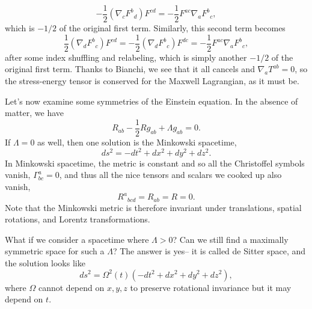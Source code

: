 {\begin{equation*}
        -\frac{1}{2} (\nabla_c F^b{}_d) F^{cd} = -\frac{1}{2} F^{ac} \nabla_a F^b{}_c,
    \end{equation*}
    which is $-1/2$ of the original first term. Similarly, this second term becomes
    \begin{equation*}
        \frac{1}{2}(\nabla_d F^b{}_c)F^{cd} = -\frac{1}{2}(\nabla_d F^b{}_c) F^{dc} = -\frac{1}{2} F^{ac} \nabla_a F^b{}_c,
    \end{equation*}
    after some index shuffling and relabeling, which is simply another $-1/2$ of the original first term. Thanks to Bianchi, we see that it all cancels and $\nabla_a T^{ab} = 0$, so the stress-energy tensor is conserved for the Maxwell Lagrangian, as it must be.
    }

Let's now examine some symmetries of the Einstein equation. In the absence of matter, we have
$$R_{ab}-\frac{1}{2} R g_{ab} +\Lambda g_{ab}=0.$$
If $\Lambda=0$ as well, then one solution is the Minkowski spacetime,
$$ds^2 = -dt^2 + dx^2 +dy^2 +dz^2.$$
In Minkowski spacetime, the metric is constant and so all the Christoffel symbols vanish, $\Gamma^a_{bc}=0$, and thus all the nice tensors and scalars we cooked up also vanish,
$${R^a}_{bcd}=R_{ab}=R=0.$$ Note that the Minkowski metric is therefore invariant under translations, spatial rotations, and Lorentz transformations.

What if we consider a spacetime where $\Lambda >0$? Can we still find a maximally symmetric space for such a $\Lambda$? The answer is yes-- it is called de Sitter space, and the solution looks like
$$ds^2=\Omega^2(t) (-dt^2+dx^2+dy^2+dz^2),$$
where $\Omega$ cannot depend on $x,y,z$ to preserve rotational invariance but it may depend on $t$.

